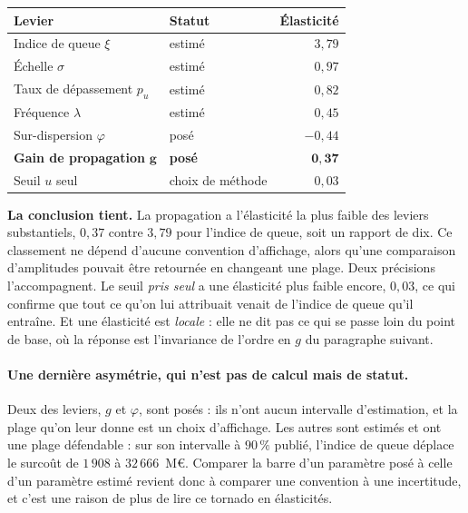 \begin{center}\footnotesize
\renewcommand{\arraystretch}{1.15}
\begin{tabular}{@{}l l r@{}}
\toprule
\textbf{Levier} & \textbf{Statut} & \textbf{Élasticité} \\
\midrule
Indice de queue $\xi$ & estimé & $3{,}79$ \\
Échelle $\sigma$ & estimé & $0{,}97$ \\
Taux de dépassement $p_u$ & estimé & $0{,}82$ \\
Fréquence $\lambda$ & estimé & $0{,}45$ \\
Sur-dispersion $\varphi$ & posé & $-0{,}44$ \\
\textbf{Gain de propagation} $\boldsymbol{g}$ & \textbf{posé} & $\mathbf{0{,}37}$ \\
Seuil $u$ seul & choix de méthode & $0{,}03$ \\
\bottomrule
\end{tabular}
\end{center}

\vspace{4pt}
\noindent \textbf{La conclusion tient.} La propagation
a l'élasticité la plus faible des leviers substantiels, $0{,}37$ contre $3{,}79$ pour l'indice de
queue, soit un rapport de dix. Ce classement ne dépend d'aucune convention d'affichage, alors
qu'une comparaison d'amplitudes pouvait être retournée en changeant une plage.
Deux précisions l'accompagnent. Le seuil \emph{pris seul} a une élasticité plus faible encore,
$0{,}03$, ce qui confirme que tout ce qu'on lui attribuait venait de l'indice de queue qu'il
entraîne. Et une élasticité est \emph{locale} : elle ne dit pas ce qui se passe loin du point de
base, où la réponse est l'invariance de l'ordre en $g$ du paragraphe suivant.

\paragraph{Une dernière asymétrie, qui n'est pas de calcul mais de statut.} Deux des leviers,
$g$ et $\varphi$, sont posés : ils n'ont aucun intervalle d'estimation, et la plage
qu'on leur donne est un choix d'affichage. Les autres sont estimés et ont une plage défendable :
sur son intervalle à $90\,\%$ publié, l'indice de queue déplace le surcoût de $1\,908$ à
$32\,666$~M\euro. Comparer la barre d'un paramètre posé à celle d'un paramètre estimé revient
donc à comparer une convention à une incertitude, et c'est une raison de plus de lire ce tornado
en élasticités.

